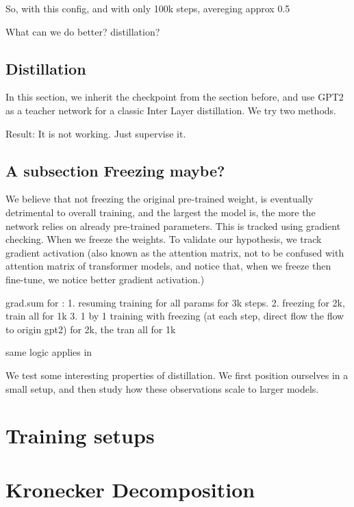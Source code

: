 \documentclass{article}
\begin{document}
So, with this config, and with only 100k steps, avereging approx 0.5%

What can we do better? distillation?

\subsection{Distillation}%
\label{sub:Distillation}

In this section, we inherit the checkpoint from the section before, and use GPT2 as a teacher network for a classic Inter Layer distillation. We try two methods. 

Result: It is not working. Just supervise it.

\subsection{A subsection Freezing maybe?}%
\label{sub:lr}

We believe that not freezing the original pre-trained weight, is eventually detrimental to overall training, and the largest the model is, the more the network relies on already pre-trained parameters. This is tracked using gradient checking. When we freeze the weights. To validate our hypothesis, we track gradient activation (also known as the attention matrix, not to be confused with attention matrix of transformer models, and notice that, when we freeze then fine-tune, we notice better gradient activation.)

	grad.sum for :
		1. resuming training for all params for 3k steps.
		2. freezing for 2k, train all for 1k
		3. 1 by 1 training with freezing (at each step, direct flow the flow to origin gpt2) for 2k, the tran all for 1k

	same logic applies in 

We test some interesting properties of distillation. We first position ourselves in a small setup, and then study how these observations scale to larger models. 

\section{Training setups}%
\label{sec:Training setups}





\section{Kronecker Decomposition}%
\label{sub:Kronecker Decomposition}
\end{document}
